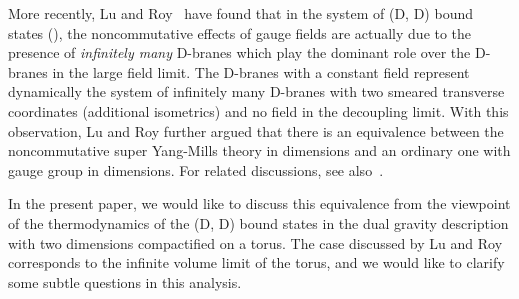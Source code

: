 \documentclass[a4paper,12pt]{article}
\begin{document}
More recently, Lu and Roy~\cite{Lu} have found that in the system of
(D\coordHE{}, D\coordHE{}) bound states (\coordHE{}), the noncommutative effects
of gauge fields are actually due to the presence of {\it infinitely many}
D\coordHE{}-branes which play the dominant role over the D\coordHE{}-branes in the
large \coordHE{} field limit. The D\coordHE{}-branes with a constant \coordHE{} field represent
dynamically the system of infinitely many D\coordHE{}-branes with two smeared
transverse coordinates (additional isometrics) and no \coordHE{} field in the
decoupling limit. With this observation, Lu and Roy further argued that
there is an equivalence between the noncommutative super Yang-Mills theory
in \coordHE{} dimensions and an ordinary one with gauge group \coordHE{} in
\coordHE{} dimensions. For related discussions, see
also~\cite{T,Ishibashi1,Ishibashi2,CS,Corn,Kato}.

In the present paper, we would like to discuss this equivalence from the
viewpoint of the thermodynamics of the (D\coordHE{}, D\coordHE{}) bound states
in the dual gravity description with two dimensions compactified on a torus.
The case discussed by Lu and Roy~\cite{Lu} corresponds to the infinite
volume limit of the torus, and we would like to clarify some subtle questions
in this analysis.
\end{document}
